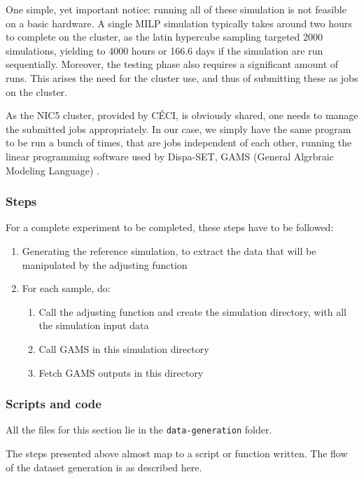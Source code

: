 One simple, yet important notice: running all of these simulation is not feasible on a basic hardware. A single MILP simulation typically takes around two hours to complete on the cluster, as the latin hypercube sampling targeted 2000 simulations, yielding to 4000 hours or 166.6 days if the simulation are run sequentially. Moreover, the testing phase also requires a significant amount of runs. This arises the need for the cluster use, and thus of submitting these as jobs on the cluster.

As the NIC5 cluster, provided by CÉCI, is obviously shared, one needs to manage the submitted jobs appropriately. In our case, we simply have the same program to be run a bunch of times, that are jobs independent of each other, running the linear programming software used by Dispa-SET, GAMS (General Algrbraic Modeling Language) \cite{GAMS}.

\subsubsection{Steps}
For a complete experiment to be completed, these steps have to be followed:
\begin{enumerate}
    \item Generating the reference simulation, to extract the data that will be manipulated by the adjusting function
    \item For each sample, do:
    \begin{enumerate}
        \item Call the adjusting function and create the simulation directory, with all the simulation input data
        \item Call GAMS in this simulation directory
        \item Fetch GAMS outputs in this directory
    \end{enumerate}
\end{enumerate}

\subsubsection{Scripts and code}

All the files for this section lie in the \texttt{data-generation} folder.

The steps presented above almost map to a script or function written. The flow of the dataset generation is as described here.


